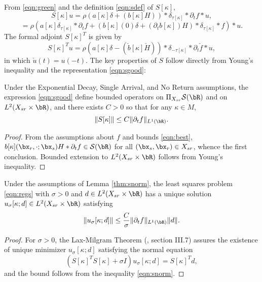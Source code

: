 From \ref{eqn:green} and the
definition \ref{eqn:sdef} of  $S[\kappa]$,
\[
  S[\kappa]u = \rho( a[\kappa]\delta    +  (b[\kappa]H)) *\delta_{\tau[\kappa]}*\partial_t f *u,
\]
\begin{equation}
  \label{eqn:sgood}
  = \rho(a[\kappa]\delta_{\tau[\kappa]}*\partial_t f +
  (b[\kappa](0)\delta + (\partial_t b[\kappa])H)
  *\delta_{\tau[\kappa]}*f) * u.
\end{equation}
The formal adjoint $S[\kappa]^T$ is given by
\begin{equation}
  \label{eqn:sadjgood}
  S[\kappa]^Tu = \rho( a[\kappa]\delta    -  (\check{b}[\kappa]\check{H}))
 *\delta_{-\tau[\kappa]}*\partial_t \check{f} *u,
\end{equation}
in which $\check{u}(t) = u(-t)$.
The key properties of $S$ follow directly from Young's inequality and
the representation \ref{eqn:sgood}:
\begin{lemma}
  \label{thm:snorm}
  Under the Exponential Decay, Single Arrival, and No Return assumptions, the
  expression \ref{eqn:sgood} define
  bounded operators on
  $\Pi_{X_{sr}} {\cal S}(\bR)$ and on
  $L^2(X_{sr} \times \bR)$, and there exists $C>0$ so
  that for any $\kappa \in M$,
  \begin{equation}
    \label{eqn:snorm}
    \|S[\kappa]\| \le C\|\partial_t f\|_{L^1(\bR)}.
  \end{equation}
\end{lemma}
\begin{proof} From the assumptions about $f$ and bounds
  \ref{eqn:best},  $b[\kappa](\bx_r,\cdot;\bx_s)H *
  \partial_tf \in {\cal S}(\bR)$ for all $(\bx_s,\bx_r) \in X_{sr}$,
  whence the first conclusion. Bounded extension to $L^2(X_{sr} \times
  \bR)$ follows from Young's inequality.
\end{proof}

\begin{prop}
  \label{thm:unorm}
  Under the assumptions of Lemma \ref{thm:snorm}, the least squares problem
  \ref{eqn:regs} with $\sigma > 0$ and $d\in L^2(X_{sr} \times \bR)$ has a unique solution
  $u_{\sigma}[\kappa;d] \in L^2(X_{sr} \times \bR)$ satisfying
  \begin{equation}
    \label{eqn:unorm}
    \|u_{\sigma}[\kappa;d]\| \le \frac{C}{\sigma}\|\partial_t f\|_{L^1(\bR)}\|d\|.
  \end{equation}
\end{prop}
\begin{proof}
For $\sigma > 0$, the Lax-Milgram Theorem (\cite{Yosida}, section
III.7) assures the existence of unique minimizer
$u_{\sigma}[\kappa;d]$ satisfying the  normal
equation
\begin{equation}
  \label{eqn:normal}
  (S[\kappa]^TS[\kappa] + \sigma I) u_{\sigma}[\kappa;d] = S[\kappa]^Td,
\end{equation}
and the bound follows from the inequality \ref{eqn:snorm}.
\end{proof}

